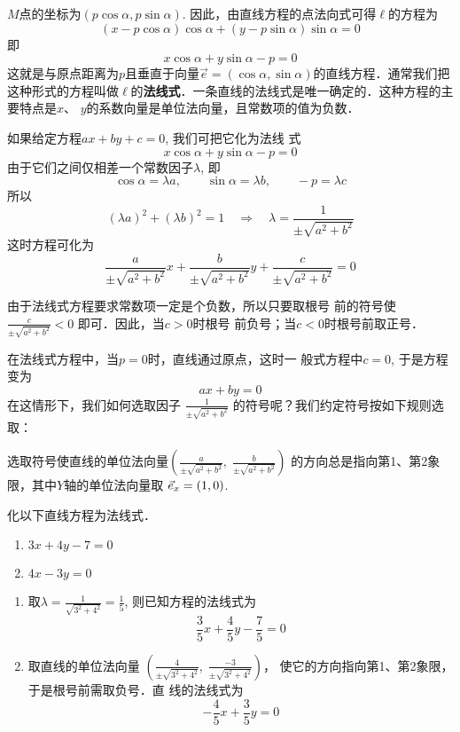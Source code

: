 $M$点的坐标为$(p\cos\alpha, p\sin\alpha)$. 
因此，由直线方程的点法向式可得$\ell$的方程为
\[(x-p\cos\alpha)\cos\alpha+(y-p\sin\alpha)\sin\alpha=0\]
即
\[x\cos\alpha+y\sin\alpha-p=0\]
这就是与原点距离为$p$且垂直于向量$\vec{e}=(\cos\alpha,\sin\alpha)$的直线方程．通常我们把这种形式的方程叫做$\ell$的\textbf{法线式}．一条直线的法线式是唯一确定的．这种方程的主要特点是$x$、
$y$的系数向量是单位法向量，且常数项的值为负数．

如果给定方程$ax+by+c=0$, 我们可把它化为法线
式
\[x\cos\alpha+y\sin\alpha-p=0\]
由于它们之间仅相差一个常数因子$\lambda$, 即
\[\cos\alpha=\lambda a,\qquad \sin\alpha=\lambda b,\qquad -p=\lambda c\]
所以
\[(\lambda a)^2+(\lambda b)^2=1 \quad \Rightarrow\quad 
\lambda=\frac{1}{\pm\sqrt{a^2+b^2}}\]
这时方程可化为
\[\frac{a}{\pm\sqrt{a^2+b^2}}x+\frac{b}{\pm\sqrt{a^2+b^2}}y+\frac{c}{\pm\sqrt{a^2+b^2}}=0\]

由于法线式方程要求常数项一定是个负数，所以只要取根号
前的符号使$\frac{c}{\pm\sqrt{a^2+b^2}}<0$
即可．因此，当$c>0$时根号
前负号；当$c<0$时根号前取正号．

在法线式方程中，当$p=0$时，直线通过原点，这时一
般式方程中$c=0$, 于是方程变为
\[ax+by=0\]
在这情形下，我们如何选取因子
$\frac{1}{\pm\sqrt{a^2+b^2}}$
的符号呢？我们约定符号按如下规则选取：

选取符号使直线的单位法向量$\left(\frac{a}{\pm\sqrt{a^2+b^2}},\; \frac{b}{\pm\sqrt{a^2+b^2}}\right)$
的方向总是指向第1、第2象限，其中$Y$轴的单位法向量取
$\vec{e}_x=(1,0)$.


\begin{example}
    化以下直线方程为法线式．
\begin{multicols}{2}
\begin{enumerate}
    \item $3x+4y-7=0$
    \item $4x-3y=0$
\end{enumerate} 
\end{multicols}
\end{example}


\begin{solution}
\begin{enumerate}
    \item 取$\lambda=\frac{1}{\sqrt{3^2+4^2}}=\frac{1}{5}$, 
    则已知方程的法线式为
    \[\frac{3}{5}x+\frac{4}{5}y-\frac{7}{5}=0\]
\item 取直线的单位法向量
$\left(\frac{4}{\pm\sqrt{3^2+4^2}},\; \frac{-3}{\pm\sqrt{3^2+4^2}}\right)$，
    使它的方向指向第1、第2象限，于是根号前需取负号．直
    线的法线式为
\[-\frac{4}{5}x+\frac{3}{5}y=0\] 
\end{enumerate}
\end{solution}

